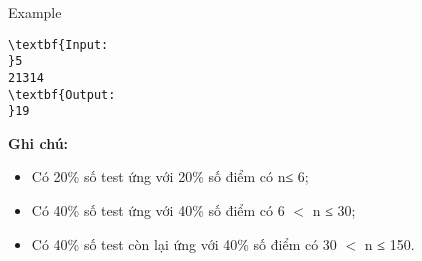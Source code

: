 Example
\begin{verbatim}
\textbf{Input:
}5
21314
\textbf{Output:
}19 
\end{verbatim}

\textbf{\textbf{Ghi chú:}}
\begin{itemize}
	\item Có 20\% số test ứng với 20\% số điểm có n≤ 6;
	\item Có 40\% số test ứng với 40\% số điểm có 6 $<$ n ≤ 30;
	\item Có 40\% số test còn lại ứng với 40\% số điểm có 30 $<$ n ≤ 150.
\end{itemize}